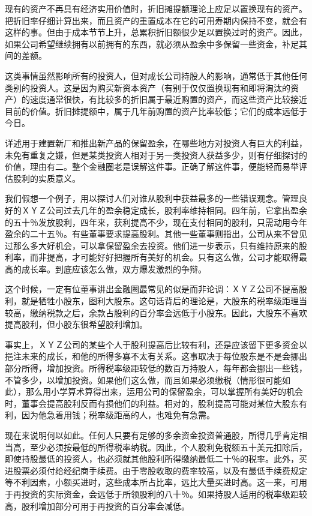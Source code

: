 \documentclass[UTF8,a4paper,zihao=-4,fontset = windows]{ctexart} %
\begin{document}
现有的资产不再具有经济实用价值时，折旧摊提额理论上应足以置换现有的资产。把折旧率仔细计算出来，而且资产的重置成本在它的可用寿期内保持不变，就会有这样的事。但由于成本节节上升，总累积折旧额很少足以置换过时的资产。因此，如果公司希望继续拥有以前拥有的东西，就必须从盈余中多保留一些资金，补足其间的差额。

这类事情虽然影响所有的投资人，但对成长公司持股人的影响，通常低于其他任何类别的投资人。这是因为购买新资本资产（有别于仅仅置换现有和即将淘汰的资产）的速度通常很快，有比较多的折旧属于最近购置的资产，而这些资产比较接近目前的价值。折旧摊提额中，属于几年前购置的资产比率较低；它们的成本远低于今日。

详述用于建置新厂和推出新产品的保留盈余，在哪些地方对投资人有巨大的利益，未免有重复之嫌，但是某类投资人相对于另一类投资人获益多少，则有仔细探讨的价值，理由有二。整个金融圈老是误解这件事。正确了解这件事，便能轻而易举评估股利的实质意义。

我们假想一个例子，用以探讨人们对谁从股利中获益最多的一些错误观念。管理良好的ＸＹＺ公司过去几年的盈余稳定成长，股利率维持相同。四年前，它拿出盈余的五十％发放股利，四年来，获利提高不少，现在支付相同的股利，只需动用今年盈余的二十五％。有些董事要求提高股利。其他一些董事则指出，公司从来不曾见过那么多大好机会，可以拿保留盈余去投资。他们进一步表示，只有维持原来的股利率，而非提高，才可能好好把握所有美好的机会。只有这么做，公司才能取得最高的成长率。到底应该怎么做，双方爆发激烈的争辩。

这个时候，一定有位董事讲出金融圈最常见的似是而非论调：ＸＹＺ公司不提高股利，就是牺牲小股东，图利大股东。这句话背后的理论是，大股东的税率级距理当较高，缴纳税款之后，余款占股利的百分率会远低于小股东。因此，大股东不喜欢提高股利，但小股东很希望股利增加。

事实上，ＸＹＺ公司的某些个人于股利提高后比较有利，还是应该留下更多资金以挹注未来的成长，和他的所得多寡不太有关系。这事取决于每位股东是不是会挪出部分所得，增加投资。所得税率级距较低的数百万持股人，每年都会挪出一些钱，不管多少，以增加投资。如果他们这么做，而且如果必须缴税（情形很可能如此），那么用小学算术算得出来，运用公司的保留盈余，可以掌握所有美好的机会时，董事会提高股利反而有损他们的利益。相对的，股利提高可能对某位大股东有利，因为他急着用钱；税率级距高的人，也难免有急需。

现在来说明何以如此。任何人只要有足够的多余资金投资普通股，所得几乎肯定相当高，至少必须按最低的所得税率纳税。因此，个人股利免税额五十美元扣除后，即使持股最低的投资人，也必须就其他股利所得缴纳最低二十％的税率。此外，买进股票必须付给经纪商手续费。由于零股收取的费率较高，以及有最低手续费规定等不利因素，小额买进时，这些成本所占比率，远比大量买进时高。这一来，可用于再投资的实际资金，会远低于所领股利的八十％。如果持股人适用的税率级距较高，股利增加部分可用于再投资的百分率会减低。
\end{document}
